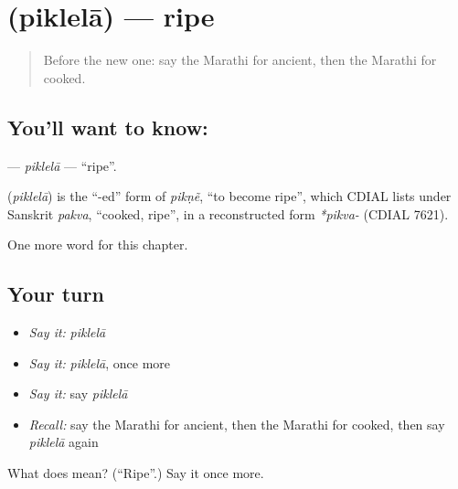 \section[\texorpdfstring{\mr{पिकलेला} (piklelā)}{पिकलेला (piklelā)}]{ (piklelā) — ripe}

\label{lesson:MR-C205-piklela}



\begin{quote}
Before the new one: say the Marathi for ancient, then the Marathi for cooked.
\end{quote}

\subsection*{You'll want to know: }
\textbf{} — \emph{piklelā} — \textquotedblleft{}ripe\textquotedblright{}.

\begin{cousinweb}
\textbf{} (\emph{piklelā}) is the \textquotedblleft{}-ed\textquotedblright{} form of \emph{pikṇẽ}, \textquotedblleft{}to become ripe\textquotedblright{}, which CDIAL lists under Sanskrit \emph{pakva}, \textquotedblleft{}cooked, ripe\textquotedblright{}, in a reconstructed form \emph{*pikva-} (CDIAL 7621).
\end{cousinweb}

\begin{grammarlens}[title={What you've built}]
One more word for this chapter.
\end{grammarlens}

\subsection*{Your turn}
\begin{itemize}
\raggedright
  \item \emph{Say it:} \emph{piklelā}
  \item \emph{Say it:} \emph{piklelā}, once more
  \item \emph{Say it:} say \emph{piklelā}
  \item \emph{Recall:} say the Marathi for ancient, then the Marathi for cooked, then say \emph{piklelā} again
\end{itemize}

\begin{tcolorbox}[breakable,colback=teal!4,colframe=teal!35!black,title={Before you move on}]
What does  mean? (\textquotedblleft{}Ripe\textquotedblright{}.) Say it once more.
\end{tcolorbox}
